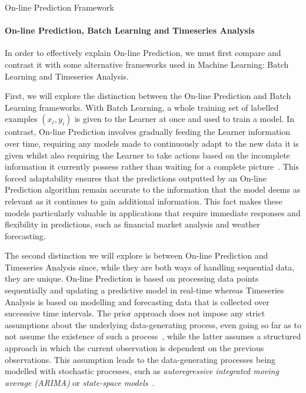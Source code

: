 \begin{protocol}[H]
    \caption{On-line Prediction Framework}\label{on-line_prediction_framework}
    \begin{algorithmic}[1]
    \end{algorithmic}
\end{protocol}

\paragraph{On-line Prediction, Batch Learning and Timeseries Analysis}\label{paragraph:on-line_prediction_batch_learning_and_timeseries_analysis}
In order to effectively explain On-line Prediction, we must first compare and contrast it with some alternative frameworks used in Machine Learning: Batch Learning and Timeseries Analysis.

First, we will explore the distinction between the On-line Prediction and Batch Learning frameworks. With Batch Learning, a whole training set of labelled examples $(x_i, y_i)$ is given to the Learner at once and used to train a model. In contrast, On-line Prediction involves gradually feeding the Learner information over time, requiring any models made to continuously adapt to the new data it is given whilst also requiring the Learner to take actions based on the incomplete information it currently possess rather than waiting for a complete picture~\cite{kalnishkan:2015}. This forced adaptability ensures that the predictions outputted by an On-line Prediction algorithm remain accurate to the information that the model deems as relevant as it continues to gain additional information. This fact makes these models particularly valuable in applications that require immediate responses and flexibility in predictions, such as financial market analysis and weather forecasting.

The second distinction we will explore is between On-line Prediction and Timeseries Analysis since, while they are both ways of handling sequential data, they are unique. On-line Prediction is based on processing data points sequentially and updating a predictive model in real-time whereas Timeseries Analysis is based on modelling and forecasting data that is collected over successive time intervals. The prior approach does not impose any strict assumptions about the underlying data-generating process, even going so far as to not assume the existence of such a process~\cite{vovk:2001}, while the latter assumes a structured approach in which the current observation is dependent on the previous observations. This assumption leads to the data-generating processes being modelled with stochastic processes, such as \textit{autoregressive integrated moving average (ARIMA)} or \textit{state-space models}~\cite{box:2015}.

